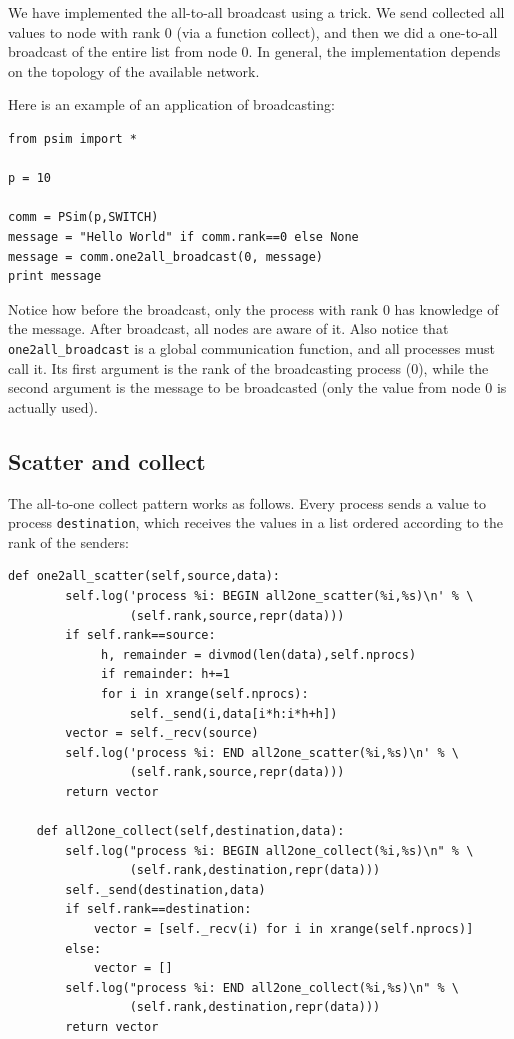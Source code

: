 \documentclass[justified,sixbynine]{tufte-book}
\def\ft{\small\tt}
\theoremstyle{plain}%
\theoremstyle{definition}
\theoremstyle{remark}
\begin{document}
\begin{fullwidth}
We have implemented the all-to-all broadcast using a trick. We send collected all values to node with rank 0 (via a function collect), and then we did a one-to-all broadcast of the entire list from node 0. In general, the implementation depends on the topology of the available network.

Here is an example of an application of broadcasting:

\begin{lstlisting}
from psim import *

p = 10

comm = PSim(p,SWITCH)
message = "Hello World" if comm.rank==0 else None
message = comm.one2all_broadcast(0, message)
print message
\end{lstlisting}

Notice how before the broadcast, only the process with rank 0 has knowledge of the message. After broadcast, all nodes are aware of it. Also notice that {\ft one2all\_broadcast} is a global communication function, and all processes must call it. Its first argument is the rank of the broadcasting process (0), while the second argument is the message to be broadcasted (only the value from node 0 is actually used).

\goodbreak\subsection{Scatter and collect}

The all-to-one collect pattern works as follows. Every process sends a value to process {\ft destination}, which receives the values in a list ordered according to the rank of the senders:

\begin{lstlisting}[caption={in file: {\ft psim.py}}]
    def one2all_scatter(self,source,data):
        self.log('process %i: BEGIN all2one_scatter(%i,%s)\n' % \
                 (self.rank,source,repr(data)))
        if self.rank==source:
             h, remainder = divmod(len(data),self.nprocs)
             if remainder: h+=1
             for i in xrange(self.nprocs):
                 self._send(i,data[i*h:i*h+h])
        vector = self._recv(source)
        self.log('process %i: END all2one_scatter(%i,%s)\n' % \
                 (self.rank,source,repr(data)))
        return vector

    def all2one_collect(self,destination,data):
        self.log("process %i: BEGIN all2one_collect(%i,%s)\n" % \
                 (self.rank,destination,repr(data)))
        self._send(destination,data)
        if self.rank==destination:
            vector = [self._recv(i) for i in xrange(self.nprocs)]
        else:
            vector = []
        self.log("process %i: END all2one_collect(%i,%s)\n" % \
                 (self.rank,destination,repr(data)))
        return vector
\end{lstlisting}


\end{fullwidth}
\end{document}
